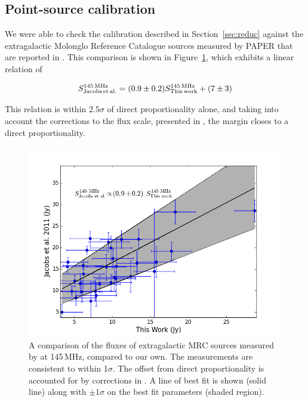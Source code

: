 \documentclass[useAMS,usenatbib]{mn2e}
\begin{document}
\subsection{Point-source calibration}
We were able to check the calibration described in Section~\ref{sec:reduc} against the extragalactic Molonglo Reference Catalogue \citep[MRC;][]{Large.81} sources measured by PAPER that are reported in \cite{Jacobs.11}. This comparison is shown in Figure~\ref{fig:PScal}, which exhibits a linear relation of

\begin{equation}
S^{145\,\rm{MHz}}_{\rm{Jacobs\,et\,al.}} = (0.9\pm0.2) S^{145\,\rm{MHz}}_{\rm{This\,work}} + (7\pm3)
\label{eq:PScal}
\end{equation}

This relation is within $2.5\sigma$ of direct proportionality alone, and taking into account the corrections to the \cite{Jacobs.11} flux scale, presented in \cite{Jacobs.13}, the margin closes to a direct proportionality.

\begin{figure}
\includegraphics[width=\columnwidth]{us_and_danny_cal.png}
\caption{A comparison of the fluxes of extragalactic MRC sources measured by \protect\cite{Jacobs.11} at 145\,MHz, compared to our own. The measurements are consistent to within 1$\sigma$. The offset from direct proportionality is accounted for by corrections in \protect\cite[][see Section 3 of their paper]{Jacobs.13}.  A line of best fit is shown (solid line) along with $\pm1\sigma$ on the best fit parameters (shaded region).}
\label{fig:PScal}
\end{figure}
\end{document}

